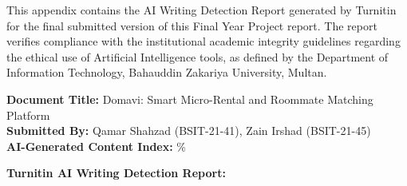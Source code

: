 
This appendix contains the AI Writing Detection Report generated by Turnitin for the final submitted version of this Final Year Project report. The report verifies compliance with the institutional academic integrity guidelines regarding the ethical use of Artificial Intelligence tools, as defined by the Department of Information Technology, Bahauddin Zakariya University, Multan.

\vspace{0.4cm}

\noindent
\textbf{Document Title:} Domavi: Smart Micro-Rental and Roommate Matching Platform \\
\textbf{Submitted By:} Qamar Shahzad (BSIT-21-41), Zain Irshad (BSIT-21-45) \\
\textbf{AI-Generated Content Index:} \underline{\hspace{2.5cm}} \%

\vspace{0.6cm}

\noindent
\textbf{Turnitin AI Writing Detection Report:}

\vspace{0.4cm}


\begin{center}
\end{center}

